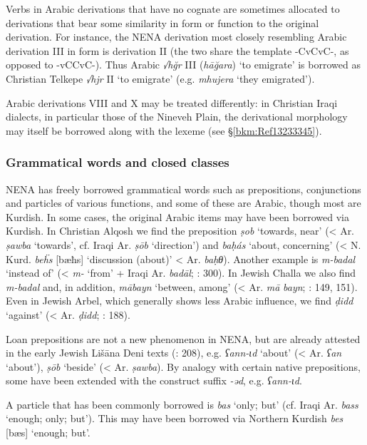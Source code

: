 \documentclass[output=paper]{langsci/langscibook}
\begin{document}
Verbs in Arabic derivations that have no cognate are sometimes allocated to derivations that bear some similarity in form or function to the original derivation. For instance, the NENA derivation most closely resembling Arabic derivation III in form is derivation II (the two share the template -CvCvC-, as opposed to -vCCvC-). Thus Arabic \textit{√hğr} III (\textit{hāğara}) ‘to emigrate’ is borrowed as Christian Telkepe \textit{√hjr} II ‘to emigrate’ (e.g. \textit{mhujera} ‘they emigrated’).

Arabic derivations VIII and X may be treated differently: in Christian Iraqi dialects, in particular those of the Nineveh Plain, the derivational morphology may itself be borrowed along with the lexeme (see §\ref{bkm:Ref13233345}).

\subsubsection{Grammatical words and closed classes}\label{closedclass}

NENA has freely borrowed grammatical words such as prepositions, conjunctions and particles of various functions, and some of these are Arabic, though most are Kurdish. In some cases, the original Arabic items may have been borrowed via Kurdish. In Christian Alqosh we find the preposition \textit{ṣob} ‘towards, near’ (< Ar. \textit{ṣawba} ‘towards’, cf. Iraqi Ar. \textit{ṣōb} ‘direction’) and \textit{baḥás} ‘about, concerning’ (< N. Kurd. \textit{be\"{h}s} [bæħs] ‘discussion (about)’ < Ar. \textit{baḥθ}). Another example is \textit{m-badal} ‘instead of’ (< \textit{m-} ‘from’ + Iraqi Ar. \textit{badāl}; \citealt{Coghill2004}: 300). In Jewish Challa we also find \textit{m-badal} and, in addition, \textit{mābayn} ‘between, among’ (< Ar. \textit{mā} \textit{bayn}; \citealt{Fassberg2010}: 149, 151). Even in Jewish Arbel, which generally shows less Arabic influence, we find \textit{ḍidd} ‘against’ (< Ar. \textit{ḍidd}; \citealt{Khan1999}: 188).

Loan prepositions are not a new phenomenon in NENA, but are already attested in the early Jewish Lišāna Deni texts (\citealt{Sabar1984}: 208), e.g. \textit{ʕann\nobreakdash-ɩd} ‘about’ (< Ar. \textit{ʕan} ‘about’), \textit{ṣōb} ‘beside’ (< Ar. \textit{ṣawba}). By analogy with certain native prepositions, some have been extended with the construct suffix \textit{\nobreakdash-əd}, e.g. \textit{ʕann\nobreakdash-ɩd}.

A particle that has been commonly borrowed is \textit{bas} ‘only; but’ (cf. Iraqi Ar. \textit{bass} ‘enough; only; but’). This may have been borrowed via Northern Kurdish \textit{bes} [bæs] ‘enough; but’.
\end{document}
